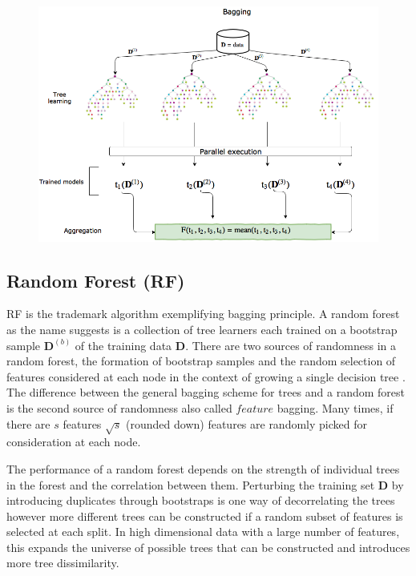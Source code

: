 \begin{figure}
\centering
\includegraphics[width=\textwidth]{images/baggingflow.png}
\label{bagging}
\end{figure}

\subsection{Random Forest (RF)}

\gls{RF} is the trademark algorithm exemplifying bagging principle. A random forest as the name suggests is a collection of tree learners each trained on a bootstrap sample $\mathbf{D}^{(b)}$ of the training data $\mathbf{D}$. There are two sources of randomness in a random forest, the formation of bootstrap samples and the random selection of features considered at each node in the context of growing a single decision tree \cite{subspace}. The difference between the general bagging scheme for trees and a random forest is the second source of randomness also called $feature$ bagging. Many times, if there are $s$ features $\sqrt{s}$ (rounded down) features are randomly picked for consideration at each node.

The performance of a random forest depends on the strength of individual trees in the forest and the correlation between them. Perturbing the training set $\mathbf{D}$ by introducing duplicates through bootstraps is one way of decorrelating the trees however more different trees can be constructed if a random subset of features is selected at each split. In high dimensional data with a large number of features, this expands the universe of possible trees that can be constructed and introduces more tree dissimilarity.

